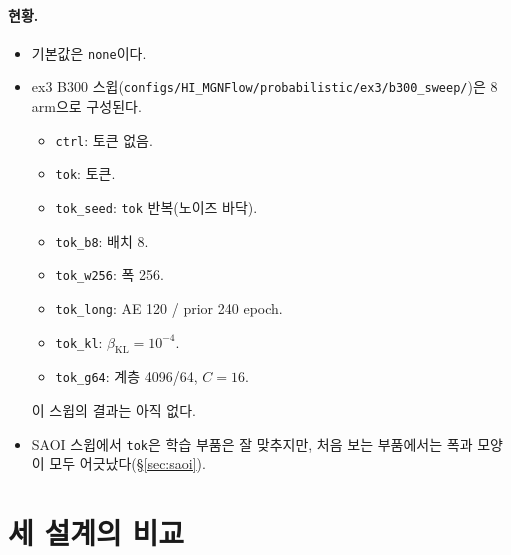 \documentclass[11pt]{article}
\newcommand{\code}[1]{\texttt{#1}}
\begin{document}
\paragraph{현황.}
\begin{itemize}
\item 기본값은 \code{none}이다.
\item ex3 B300 스윕(\code{configs/HI\_MGNFlow/probabilistic/ex3/b300\_sweep/})은
  8 arm으로 구성된다.
  \begin{itemize}
  \item \code{ctrl}: 토큰 없음.
  \item \code{tok}: 토큰.
  \item \code{tok\_seed}: \code{tok} 반복(노이즈 바닥).
  \item \code{tok\_b8}: 배치 8.
  \item \code{tok\_w256}: 폭 256.
  \item \code{tok\_long}: AE 120 / prior 240 epoch.
  \item \code{tok\_kl}: $\beta_{\text{KL}}=10^{-4}$.
  \item \code{tok\_g64}: 계층 4096/64, $C=16$.
  \end{itemize}
  이 스윕의 결과는 아직 없다.
\item SAOI 스윕에서 \code{tok}은 학습 부품은 잘 맞추지만, 처음 보는 부품에서는
  폭과 모양이 모두 어긋났다(\S\ref{sec:saoi}).
\end{itemize}

\section{세 설계의 비교}\label{sec:compare}
\end{document}
